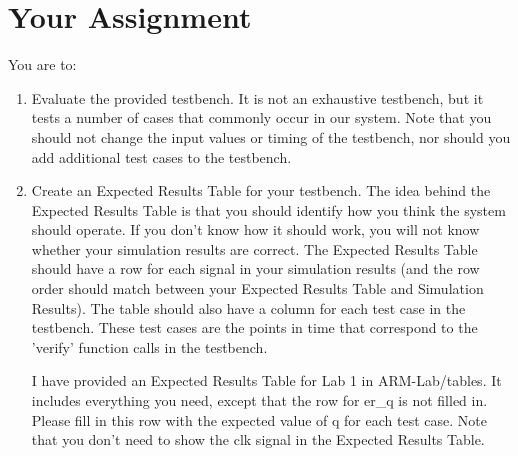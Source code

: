 \section{Your Assignment}

You are to:
\begin{enumerate}
\item Evaluate the provided testbench.  It is not an exhaustive testbench, but it tests a number of cases that commonly occur in our system.  Note that you should not change the input values or timing of the testbench, nor should you add additional test cases to the testbench.
\item Create an Expected Results Table for your testbench.  The idea behind the Expected Results Table is that you should identify how you think the system should operate.  If you don't know how it should work, you will not know whether your simulation results are correct.  The Expected Results Table should have a row for each signal in your simulation results (and the row order should match between your Expected Results Table and Simulation Results).  The table should also have a column for each test case in the testbench.  These test cases are the points in time that correspond to the 'verify' function calls in the testbench.

I have provided an Expected Results Table for Lab 1 in ARM-Lab/tables.  It includes everything you need, except that the row for er\_q is not filled in. Please fill in this row with the expected value of q for each test case.  Note that you don't need to show the clk signal in the Expected Results Table. 



\end{enumerate}
